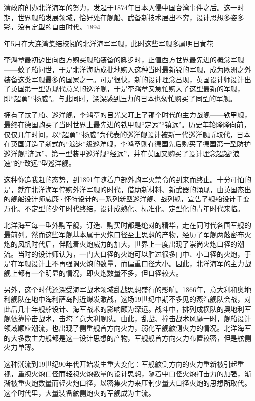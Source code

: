 \documentclass[12pt,UTF8]{ctexbook}
\begin{document}
清政府创办北洋海军的努力，发起于1874年日本入侵中国台湾事件之后。这一时期，世界舰船发展领域，恰好处在舰船、武备新技术层出不穷，设计思想多姿多彩，没有定型的自由时代。1894


年5月在大连湾集结校阅的北洋海军军舰，此时这些军舰多属明日黄花

李鸿章最初迈出向西方购买舰船装备的脚步时，正值西方世界最先进的概念军舰——蚊子船问世，于是北洋海防成批地购入这种当时最新锐的军舰，成为欧洲之外装备这类军舰最多的国家之一。可是很快，新的设计理念出现，英国设计师设计出了英国第一型近现代意义的巡洋舰，于是李鸿章又急忙购入了这型最新的军舰，即“超勇”“扬威”。与此同时，深深感到压力的日本也匆忙购买了同型的军舰。

拥有了蚊子船、巡洋舰，李鸿章的目光又盯上了那个时代的主力战舰——铁甲舰，最终在德国购买了当时世界上最先进的铁甲舰“定远”“镇远”。历史车轮隆隆向前，仅仅几年时间，以“超勇”“扬威”为代表的巡洋舰设计被新一代巡洋舰所取代，日本在英国订造了新式的“浪速”级巡洋舰，李鸿章则在德国先后购买了德国第一型防护巡洋舰“济远”、第一型装甲巡洋舰“经远”，并在英国又购买了设计理念超越“浪速”的“致远”型巡洋舰。

这种你追我赶的态势，到1891年随着户部外购军火禁令的到来而终止。十分可怕的是，就在北洋海军停购外洋军舰的时代，借助新材料、新武器的涌现，由英国杰出的舰船设计师威廉·怀特设计的一系列新型巡洋舰、战列舰，宣告了舰船设计千变万化、不定型的少年时代终结，设计成熟化、标准化、定型化的青年时代来临。

北洋海军每一型外购军舰，订造、购买时都是绝对的精华，走在同时代各国军舰的最前列。然而这些军舰基本属于火炮口径至上思想的产物，经历了军舰两舷密布火炮的风帆时代后，伴随着火炮威力的加大，世界上一度出现了崇尚火炮口径的潮流。当时的设计师认为，一门大口径的火炮可以胜过很多门中、小口径的火炮，于是在军舰设计上不再强调火炮的数量，而偏重口径大小。因此，北洋海军的主力战舰上都有一个明显的情况，即火炮数量不多，但口径较大。

另外，这个时代还深受海军战术领域乱战思想盛行的影响。1866年，意大利和奥地利舰队在地中海利萨岛附近爆发激战，这场19世纪中期不多见的蒸汽舰队会战，对此后几十年舰船设计、海军战术的影响颇为深远。战斗中，排列成横队的奥地利军舰依靠撞击战术，击垮了意大利舰队。由此，乱战、撞击战术风靡一时，舰船设计领域顺应潮流，也出现了侧重舰首方向火力，弱化军舰舷侧火力的情况。北洋海军的大多数主力舰都是这一设计思想的产物，军舰舰首方向火力布置较密，但是舷侧火力单薄。

这种潮流到19世纪90年代开始发生重大变化：军舰舷侧方向的火力重新被引起重视，重视火炮口径而轻视火炮数量的设计思想，随着中口径火炮打击力的加强，渐渐被重火炮数量而轻火炮口径，以密集火力来压制少量大口径火炮的思想所取代。这个时代里，大量装备舷侧炮火的军舰成为主流。
\end{document}
